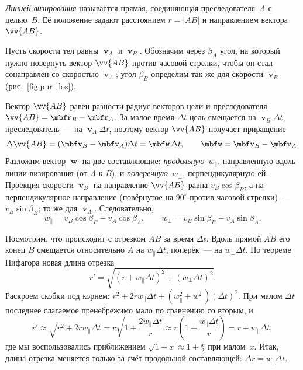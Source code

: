 \documentclass[../main.tex]{subfiles}
\begin{document}
\begin{definition}
\textit{Линией визирования} называется прямая, соединяющая преследователя~$A$ с
целью~$B$. Её положение задают расстоянием $r = |AB|$ и направлением вектора
$\vv{AB}$.
\end{definition}

Пусть скорости тел равны $\mbfv_A$ и $\mbfv_B$. Обозначим через $\beta_A$ угол, на
который нужно повернуть вектор $\vv{AB}$ против часовой стрелки, чтобы он стал
сонаправлен со скоростью $\mbfv_A$; угол $\beta_B$ определим так же для скорости
$\mbfv_B$ (рис.~\ref{fig:pur_los}).


Вектор $\vv{AB}$ равен разности радиус-векторов цели и преследователя:
$\vv{AB} = \mbfr_B - \mbfr_A$. За малое время $\Delta t$ цель смещается на
$\mbfv_B\Delta t$, преследователь~--- на $\mbfv_A\Delta t$, поэтому вектор $\vv{AB}$
получает приращение
\[
\Delta\vv{AB} = (\mbfv_B - \mbfv_A)\Delta t = \mbfw\,\Delta t,
\qquad
\mbfw = \mbfv_B - \mbfv_A.
\]
Разложим вектор $\mbfw$ на две составляющие: \textit{продольную}~$w_\parallel$,
направленную вдоль линии визирования (от $A$ к $B$), и \textit{поперечную}~$w_\perp$,
перпендикулярную ей. Проекция скорости $\mbfv_B$ на направление $\vv{AB}$ равна
$v_B\cos\beta_B$, а на перпендикулярное направление (повёрнутое на $90^\circ$ против
часовой стрелки)~--- $v_B\sin\beta_B$; то же для $\mbfv_A$. Следовательно,
\[
w_\parallel = v_B\cos\beta_B - v_A\cos\beta_A,
\qquad
w_\perp = v_B\sin\beta_B - v_A\sin\beta_A.
\]

Посмотрим, что происходит с отрезком $AB$ за время $\Delta t$. Вдоль прямой $AB$ его
конец $B$ смещается относительно $A$ на $w_\parallel\Delta t$, поперёк~--- на
$w_\perp\Delta t$. По теореме Пифагора новая длина отрезка
\[
r' = \sqrt{(r + w_\parallel\Delta t)^2 + (w_\perp\Delta t)^2}.
\]
Раскроем скобки под корнем: $r^2 + 2rw_\parallel\Delta t + (w_\parallel^2 +
w_\perp^2)(\Delta t)^2$. При малом $\Delta t$ последнее слагаемое пренебрежимо мало
по сравнению со вторым, и
\[
r' \approx \sqrt{r^2 + 2rw_\parallel\Delta t}
= r\sqrt{1 + \frac{2w_\parallel\Delta t}{r}}
\approx r\left(1 + \frac{w_\parallel\Delta t}{r}\right)
= r + w_\parallel\Delta t,
\]
где мы воспользовались приближением $\sqrt{1 + x} \approx 1 + \frac{x}{2}$ при
малом~$x$. Итак, длина отрезка меняется только за счёт продольной составляющей:
$\Delta r = w_\parallel\Delta t$.
\end{document}
